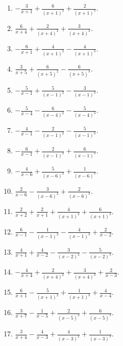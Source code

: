 \documentclass[11pt,oneside]{book}
\begin{document}
\begin{enumerate}[leftmargin=*,label=\textbf{V\arabic*.},itemsep=0.45\baselineskip]
\item $\displaystyle - \frac{3}{x + 1} + \frac{6}{\left(x + 1\right)^{2}} + \frac{2}{\left(x + 1\right)^{3}}$.
\item $\displaystyle \frac{6}{x + 4} + \frac{2}{\left(x + 4\right)^{2}} + \frac{3}{\left(x + 4\right)^{3}}$.
\item $\displaystyle - \frac{6}{x + 1} + \frac{4}{\left(x + 1\right)^{2}} - \frac{4}{\left(x + 1\right)^{3}}$.
\item $\displaystyle \frac{3}{x + 5} + \frac{6}{\left(x + 5\right)^{2}} - \frac{6}{\left(x + 5\right)^{3}}$.
\item $\displaystyle - \frac{5}{x - 1} + \frac{5}{\left(x - 1\right)^{2}} - \frac{3}{\left(x - 1\right)^{3}}$.
\item $\displaystyle - \frac{5}{x - 4} - \frac{6}{\left(x - 4\right)^{2}} - \frac{5}{\left(x - 4\right)^{3}}$.
\item $\displaystyle - \frac{4}{x - 1} - \frac{2}{\left(x - 1\right)^{2}} - \frac{5}{\left(x - 1\right)^{3}}$.
\item $\displaystyle - \frac{6}{x - 1} + \frac{2}{\left(x - 1\right)^{2}} + \frac{6}{\left(x - 1\right)^{3}}$.
\item $\displaystyle - \frac{4}{x - 6} + \frac{5}{\left(x - 6\right)^{2}} + \frac{1}{\left(x - 6\right)^{3}}$.
\item $\displaystyle \frac{2}{x - 6} - \frac{3}{\left(x - 6\right)^{2}} + \frac{2}{\left(x - 6\right)^{3}}$.
\item $\displaystyle \frac{2}{x + 2} + \frac{2}{x + 1} + \frac{4}{\left(x + 1\right)^{2}} + \frac{6}{\left(x + 1\right)^{3}}$.
\item $\displaystyle \frac{6}{x - 1} - \frac{1}{\left(x - 1\right)^{2}} - \frac{4}{\left(x - 1\right)^{3}} + \frac{2}{x - 2}$.
\item $\displaystyle \frac{4}{x + 1} + \frac{4}{x - 2} - \frac{3}{\left(x - 2\right)^{2}} - \frac{5}{\left(x - 2\right)^{3}}$.
\item $\displaystyle - \frac{4}{x + 4} + \frac{2}{\left(x + 4\right)^{2}} + \frac{3}{\left(x + 4\right)^{3}} + \frac{2}{x - 3}$.
\item $\displaystyle \frac{6}{x + 1} - \frac{5}{\left(x + 1\right)^{2}} + \frac{1}{\left(x + 1\right)^{3}} + \frac{4}{x - 4}$.
\item $\displaystyle \frac{3}{x + 7} - \frac{1}{x - 5} + \frac{2}{\left(x - 5\right)^{2}} + \frac{6}{\left(x - 5\right)^{3}}$.
\item $\displaystyle \frac{3}{x + 4} - \frac{4}{x - 3} + \frac{4}{\left(x - 3\right)^{2}} + \frac{1}{\left(x - 3\right)^{3}}$.

\end{enumerate}
\end{document}
